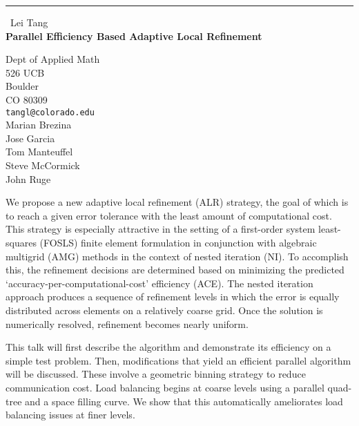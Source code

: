 \documentclass{report}
\begin{document}
\begin{center}
\rule{6in}{1pt} \
{\large Lei Tang \\
{\bf Parallel Efficiency Based Adaptive Local Refinement}}

Dept of Applied Math \\ 526 UCB \\ Boulder \\ CO 80309
\\
{\tt tangl@colorado.edu}\\
Marian Brezina\\
Jose Garcia\\
Tom Manteuffel\\
Steve McCormick\\
John Ruge\end{center}

We propose a new adaptive local refinement (ALR) strategy, the goal of
which is to reach a given error
tolerance with the least amount of computational cost. This strategy is
especially attractive in the setting
of a first-order system least-squares (FOSLS) finite element formulation
in conjunction with algebraic multigrid
(AMG) methods in the context of nested iteration (NI). To accomplish
this, the refinement decisions are determined
based on minimizing the predicted `accuracy-per-computational-cost'
efficiency (ACE). The nested iteration approach
produces a sequence of refinement levels in which the error is equally
distributed across elements on a
relatively coarse grid. Once the solution is numerically resolved,
refinement becomes nearly uniform.

This talk will first describe the algorithm and demonstrate its
efficiency on a simple test problem. Then,
modifications that yield an efficient parallel algorithm will be
discussed. These involve a geometric binning
strategy to reduce communication cost. Load balancing begins at coarse
levels using a parallel quad-tree and a space filling curve. We show that
this automatically ameliorates load balancing issues at finer levels.
\end{document}
